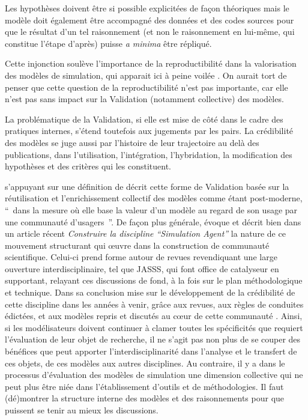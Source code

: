 Les hypothèses doivent être si possible explicitées de façon théoriques mais le modèle doit également être accompagné des données et des codes sources pour que le résultat d'un tel raisonnement (et non le raisonnement en lui-même, qui constitue l'étape d'après) puisse \textit{a minima} être répliqué. %

Cette injonction soulève l'importance de la reproductibilité dans la valorisation des modèles de simulation, qui apparait ici à peine voilée \autocites{Amblard2006, Wilensky2007a, Rouchier2013, Thiele2015}. On aurait tort de penser que cette question de la reproductibilité n'est pas importante, car elle n'est pas sans impact sur la Validation (notamment collective) des modèles. 

La problématique de la Validation, si elle est mise de côté dans le cadre des pratiques internes, s'étend toutefois aux jugements par les pairs. La crédibilité des modèles se juge aussi par l'histoire de leur trajectoire au delà des publications, dans l'utilisation, l'intégration, l'hybridation, la modification des hypothèses et des critères qui les constituent.

\textcites{Rouchier2013} s'appuyant sur une définition de \textcite{Ahrweiler2005} décrit cette forme de Validation basée sur la réutilisation et l'enrichissement collectif des modèles comme étant post-moderne, \enquote{ dans la mesure où elle base la valeur d'un modèle au regard de son usage par une communauté d'usagers }. De façon plus générale, \autocite{Rouchier2013} évoque et décrit bien dans un article récent \textit{Construire la discipline \enquote{Simulation Agent}} la nature de ce mouvement structurant qui œuvre dans la construction de communauté scientifique. Celui-ci prend forme autour de revues revendiquant une large ouverture interdisciplinaire, tel que JASSS, qui font office de catalyseur en supportant, relayant ces discussions de fond, à la fois sur le plan méthodologique et technique. Dans sa conclusion \autocite{Rouchier2013} mise sur le développement de la crédibilité de cette discipline dans les années à venir, grâce aux revues, aux règles de conduites édictées, et aux modèles repris et discutés au cœur de cette communauté \autocite{Hales2003}. Ainsi, si les modélisateurs doivent continuer à clamer toutes les spécificités que requiert l'évaluation de leur objet de recherche, il ne s'agit pas non plus de se couper des bénéfices que peut apporter l'interdisciplinarité dans l'analyse et le transfert de ces objets, de ces modèles aux autres disciplines. Au contraire, il y a dans le processus d'évaluation des modèles de simulation une dimension collective qui ne peut plus être niée dans l'établissement d'outils et de méthodologies. Il faut (dé)montrer la structure interne des modèles et des raisonnements pour que puissent se tenir au mieux les discussions.

